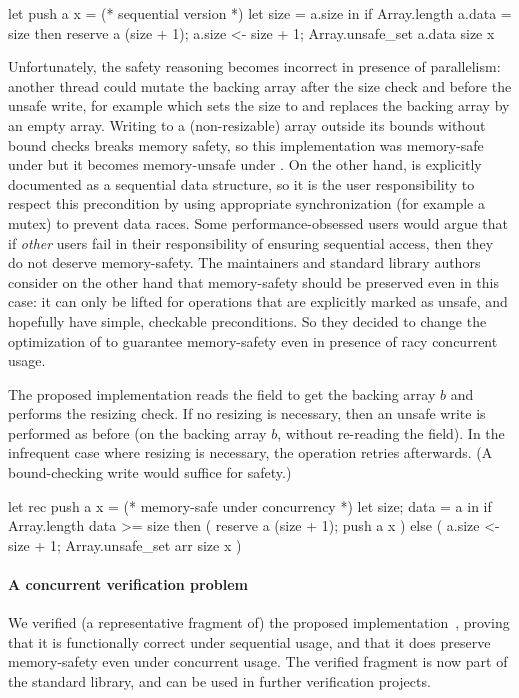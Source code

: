 \begin{ocamlcode}
let push a x = (* sequential version *)
  let size = a.size in
  if Array.length a.data = size then reserve a (size + 1);
  a.size <- size + 1;
  Array.unsafe_set a.data size x
\end{ocamlcode}

Unfortunately, the safety reasoning becomes incorrect in presence of parallelism: another thread could mutate the backing array after the size check and before the unsafe write, for example  which sets the size to  and replaces the backing array by an empty array.
Writing to a (non-resizable) array outside its bounds without bound checks breaks memory safety, so this implementation was memory-safe under \OCamlFour but it becomes memory-unsafe under \OCamlFive. On the other hand,  is explicitly documented as a sequential data structure, so it is the user responsibility to respect this precondition by using appropriate synchronization (for example a mutex) to prevent data races. Some performance-obsessed users would argue that if \emph{other} users fail in their responsibility of ensuring sequential access, then they do not deserve memory-safety. The \OCaml maintainers and standard library authors consider on the other hand that memory-safety should be preserved even in this case: it can only be lifted for operations that are explicitly marked as unsafe, and hopefully have simple, checkable preconditions. So they decided to change the optimization of  to guarantee memory-safety even in presence of racy concurrent usage.

The proposed implementation reads the  field to get the backing array $b$ and performs the resizing check. If no resizing is necessary, then an unsafe write is performed as before (on the backing array $b$, without re-reading the  field). In the infrequent case where resizing is necessary, the operation retries afterwards. (A bound-checking write would suffice for safety.)

\begin{ocamlcode}
let rec push a x = (* memory-safe under concurrency *)
  let {size; data} = a in
  if Array.length data >= size
  then ( reserve a (size + 1); push a x )
  else ( a.size <- size + 1; Array.unsafe_set arr size x )
\end{ocamlcode}

\paragraph{A concurrent verification problem} We verified (a representative fragment of) the proposed  implementation~, proving that it is functionally correct under sequential usage, and that it does preserve memory-safety even under concurrent usage. The verified fragment is now part of the \Zoo standard library, and can be used in further verification projects.

